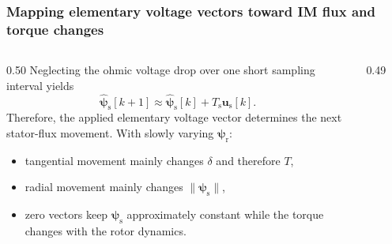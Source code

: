 \begin{frame}[b]
    \frametitle{Mapping elementary voltage vectors toward IM flux and torque changes}
    \begin{columns}[T,onlytextwidth]
        \begin{column}{0.50\textwidth}
            Neglecting the ohmic voltage drop over one short sampling interval yields
            \begin{equation}
                \hat{\bm{\psi}}_\mathrm{s}[k+1]
                \approx \hat{\bm{\psi}}_\mathrm{s}[k]+T_\mathrm{s}\bm{u}_\mathrm{s}[k].
                \label{eq:IM_DTC_flux_increment_v2}
            \end{equation}\pause%
            Therefore, the applied elementary voltage vector determines the next stator-flux movement. With slowly varying $\bm{\psi}_\mathrm{r}$:
            \begin{itemize}
                \item tangential movement mainly changes $\delta$ and therefore $T$,
                \item radial movement mainly changes $\|\bm{\psi}_\mathrm{s}\|$,
                \item zero vectors keep $\bm{\psi}_\mathrm{s}$ approximately constant while the torque changes with the rotor dynamics.
            \end{itemize}
        \end{column}
        \begin{column}{0.49\textwidth}
            \centering
            \begin{figure}
\end{figure}
\end{column}
\end{columns}
\end{frame}

